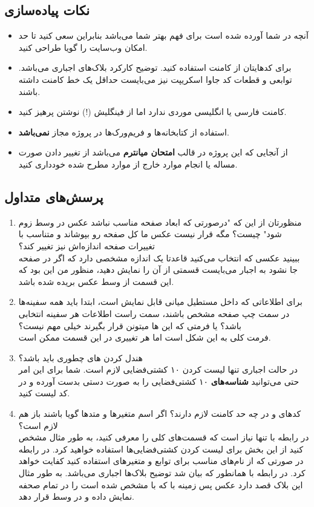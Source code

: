 \documentclass[../main.tex]{subfiles}
\begin{document}
\subsection{نکات پیاده‌سازی}

\begin{itemize}
    \item آنچه در شما آورده شده است برای فهم بهتر شما می‌باشد بنابراین سعی کنید تا حد امکان وب‌سایت را گویا طراحی کنید.
    \item برای کدهایتان از کامنت استفاده کنید. توضیح کارکرد بلاک‌های  اجباری می‌باشد. توابعی و قطعات کد جاوا اسکریپت نیز می‌بایست حداقل یک خط کامنت داشته باشند.
    \item کامنت فارسی یا انگلیسی موردی ندارد اما از فینگلیش (!) نوشتن پرهیز کنید.
    \item استفاده از کتابخانه‌ها و فریم‌ورک‌ها در پروژه مجاز \textbf{نمی‌باشد}.
    \item از آنجایی که این پروژه در قالب \textbf{امتحان میانترم} می‌باشد از تغییر دادن صورت مساله یا انجام موارد خارج از موارد مطرح شده خودداری کنید.
\end{itemize}

\subsection{پرسش‌های متداول}

\begin{enumerate}
  \item منظورتان از این که "درصورتی که ابعاد صفحه مناسب نباشد عکس در وسط زوم شود" چیست؟ مگه قرار نیست عکس ما کل صفحه رو بپوشاند و متناسب با تغییرات صفحه اندازه‌اش نیز تغییر کند؟\\
        ببینید عکسی که انتخاب می‌کنید قاعدتا یک اندازه مشخصی دارد که اگر در صفحه جا نشود به اجبار می‌بایست قسمتی از آن را نمایش دهید، منظور من این بود که این قسمت از وسط عکس بریده شده باشد.
  \item برای اطلاعاتی که داخل مستطیل میانی قابل نمایش است، ابتدا باید همه سفینه‌ها در سمت چپ صفحه مشخص باشند، سمت راست اطلاعات هر سفینه انتخابی باشد؟ یا فرمتی که این ها میتونن قرار بگیرند خیلی مهم نیست؟\\
        فرمت کلی به این شکل است اما هر تغییری در این قسمت ممکن است.
  \item هندل کردن ‌های  چطوری باید باشد؟\\
        در حالت اجباری تنها لیست کردن ۱۰ کشتی‌فضایی لازم است. شما برای این امر حتی می‌توانید \textbf{شناسه‌های} ۱۰ کشتی‌فضایی را به صورت دستی بدست آورده و در کد لیست کنید.
  \item کدهای  و  در چه حد کامنت لازم دارند؟ اگر اسم متغیرها و متدها گویا باشند باز هم لازم است؟\\
        در رابطه با  تنها نیاز است که قسمت‌های کلی را معرفی کنید، به طور مثال مشخص کنید از این بخش برای لیست کردن کشتی‌فضایی‌ها استفاده خواهید کرد. در رابطه  در صورتی که از نام‌های مناسب برای توابع و متغیرهای استفاده کنید کفایت خواهد کرد. در رابطه با  همانطور که بیان شد توضیح بلاک‌ها اجباری می‌باشد. به طور مثال این بلاک قصد دارد عکس پس زمینه با که با  مشخص شده است را در تمام صحفه نمایش داده و در وسط قرار دهد.
\end{enumerate}
\end{document}
